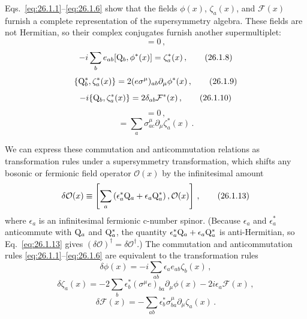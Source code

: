 Eqs.~\eqref{eq:26.1.1}--\eqref{eq:26.1.6} show that the fields
\(\phi(x)\), \(\zeta_a(x)\), and \(\mathcal{F}(x)\) furnish a complete
representation of the supersymmetry algebra. These fields are not Hermitian,
so their complex conjugates furnish another supermultiplet:
\begin{equation}
  [\WeylQ_a^*,\phi^*(x)]=0\,,
  \tag{26.1.7}\label{eq:26.1.7}
\end{equation}
\begin{equation}
  -i\sum_b e_{ab}[\mathrm{Q}_b,\phi^*(x)]=\zeta_a^*(x)\,,
  \tag{26.1.8}\label{eq:26.1.8}
\end{equation}
\begin{equation}
  \{\mathrm{Q}_b^*,\zeta_a^*(x)\}
  =2(e\sigma^\mu)_{ab}\partial_\mu\phi^*(x)\,,
  \tag{26.1.9}\label{eq:26.1.9}
\end{equation}
\begin{equation}
  -i\{\mathrm{Q}_b,\zeta_a^*(x)\}
  =2\delta_{ab}\mathcal{F}^*(x)\,,
  \tag{26.1.10}\label{eq:26.1.10}
\end{equation}
\begin{equation}
  [\WeylQ_c,\mathcal{F}^*(x)]=0\,,
  \tag{26.1.11}\label{eq:26.1.11}
\end{equation}
\begin{equation}
  [\WeylQ_c^*,\mathcal{F}^*(x)]
  =\sum_a\sigma^\mu_{ac}\partial_\mu\zeta_a^*(x)\,.
  \tag{26.1.12}\label{eq:26.1.12}
\end{equation}

We can express these commutation and anticommutation relations as
transformation rules under a supersymmetry transformation, which shifts any
bosonic or fermionic field operator \(\mathcal{O}(x)\) by the infinitesimal
amount
\begin{equation}
  \delta\mathcal{O}(x)
  \equiv
  \left[\sum_a\left(\epsilon_a^*\mathrm{Q}_a
    +\epsilon_a\mathrm{Q}_a^*\right),\mathcal{O}(x)\right]\,,
  \tag{26.1.13}\label{eq:26.1.13}
\end{equation}
where \(\epsilon_a\) is an infinitesimal fermionic c-number spinor. (Because
\(\epsilon_a\) and \(\epsilon_a^*\) anticommute with \(\mathrm{Q}_a\) and
\(\mathrm{Q}_a^*\), the quantity
\(\epsilon_a^*\mathrm{Q}_a+\epsilon_a\mathrm{Q}_a^*\) is anti-Hermitian, so
Eq.~\eqref{eq:26.1.13} gives
\((\delta\mathcal{O})^\dagger=\delta\mathcal{O}^\dagger\).) The commutation
and anticommutation rules \eqref{eq:26.1.1}--\eqref{eq:26.1.6} are
equivalent to the transformation rules
\begin{equation}
  \delta\phi(x)
  =-i\sum_{ab}\epsilon_a e_{ab}\zeta_b(x)\,,
  \tag{26.1.14}\label{eq:26.1.14}
\end{equation}
\begin{equation}
  \delta\zeta_a(x)
  =-2\sum_b\epsilon_b^*(\sigma^\mu e)_{ba}\partial_\mu\phi(x)
    -2i\epsilon_a\mathcal{F}(x)\,,
  \tag{26.1.15}\label{eq:26.1.15}
\end{equation}
\begin{equation}
  \delta\mathcal{F}(x)
  =-\sum_{ab}\epsilon_b^*\sigma^\mu_{ba}\partial_\mu\zeta_a(x)\,.
  \tag{26.1.16}\label{eq:26.1.16}
\end{equation}


